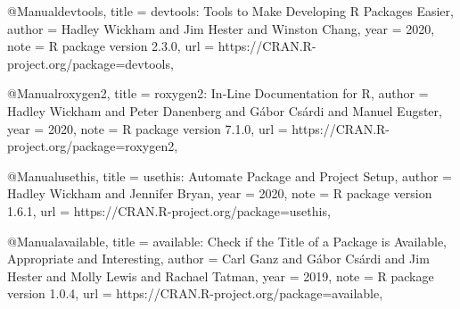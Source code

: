 @Manual{devtools,
    title = {devtools: Tools to Make Developing R Packages Easier},
    author = {Hadley Wickham and Jim Hester and Winston Chang},
    year = {2020},
    note = {R package version 2.3.0},
    url = {https://CRAN.R-project.org/package=devtools},
  }
  
  @Manual{roxygen2,
    title = {roxygen2: In-Line Documentation for R},
    author = {Hadley Wickham and Peter Danenberg and Gábor Csárdi and Manuel Eugster},
    year = {2020},
    note = {R package version 7.1.0},
    url = {https://CRAN.R-project.org/package=roxygen2},
  }
  
    @Manual{usethis,
    title = {usethis: Automate Package and Project Setup},
    author = {Hadley Wickham and Jennifer Bryan},
    year = {2020},
    note = {R package version 1.6.1},
    url = {https://CRAN.R-project.org/package=usethis},
  }
  
  @Manual{available,
    title = {available: Check if the Title of a Package is Available, Appropriate and
Interesting},
    author = {Carl Ganz and Gábor Csárdi and Jim Hester and Molly Lewis and Rachael Tatman},
    year = {2019},
    note = {R package version 1.0.4},
    url = {https://CRAN.R-project.org/package=available},
  }
